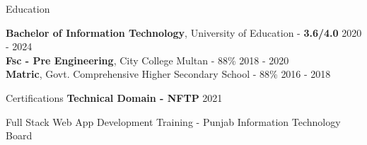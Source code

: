 \documentclass{resume} %
\begin{document}
\begin{rSection}{Education}
	
	
	{\bf Bachelor of Information Technology}, University of Education - {\bf 3.6/4.0 }\hfill {2020 - 2024} 
	\\
	{\bf Fsc  - Pre Engineering}, City College Multan - 88\% \hfill {2018 - 2020}
	\\
	{\bf Matric}, Govt. Comprehensive Higher Secondary School - 88\% \hfill {2016 - 2018}
	
	
\end{rSection}

\begin{rSection}{Certifications} 
	\textbf{Technical Domain - NFTP} \hfill 2021 
    \item {Full Stack Web App Development Training - Punjab Information Technology
    Board}



\end{rSection}

\end{document}
